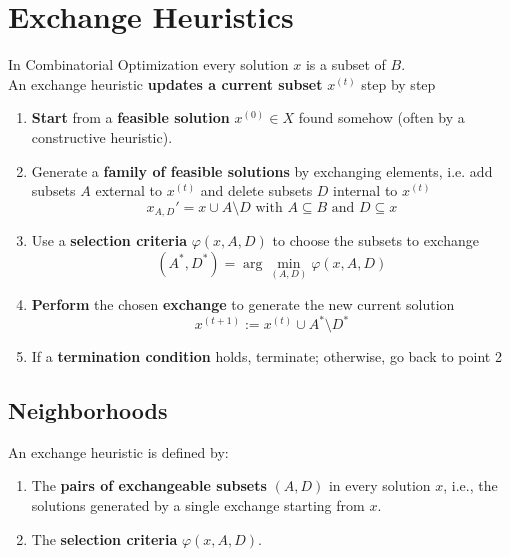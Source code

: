 \section{Exchange Heuristics}

In Combinatorial Optimization every solution $x$ is a subset of $B$.\\

An exchange heuristic \textbf{updates a current subset} $x^{(t)}$ step by step

\begin{enumerate}
	\item \textbf{Start} from a \textbf{feasible solution} $x^{(0)} \in X$ found somehow (often by a constructive heuristic).\\
	
	\item Generate a \textbf{family of feasible solutions} by exchanging elements, i.e. add subsets $A$ external to $x^{(t)}$ and delete subsets $D$ internal to $x^{(t)}$
	$$ x_{A,D}' = x \cup A \setminus D \text{ with } A \subseteq B \text{ and } D \subseteq x $$
	
	\item Use a \textbf{selection criteria} $\varphi (x, A, D)$ to choose the subsets to exchange
	$$ (A^\ast, D^\ast) = \arg \min_{(A,D)} \varphi (x, A, D) $$
	
	\item \textbf{Perform} the chosen \textbf{exchange} to generate the new current solution
	$$ x^{(t+1)} := x^{(t)} \cup A^\ast \setminus D^\ast $$
	
	\item If a \textbf{termination condition} holds, terminate; otherwise, go back to point 2
\end{enumerate}

\newpage

\subsection{Neighborhoods} 

An exchange heuristic is defined by:
\begin{enumerate}
	\item The \textbf{pairs of exchangeable subsets} $(A, D)$ in every solution $x$, i.e., the solutions generated by a single exchange starting from $x$.\\
	
	\item The \textbf{selection criteria} $\varphi (x, A, D)$.\\
\end{enumerate}


